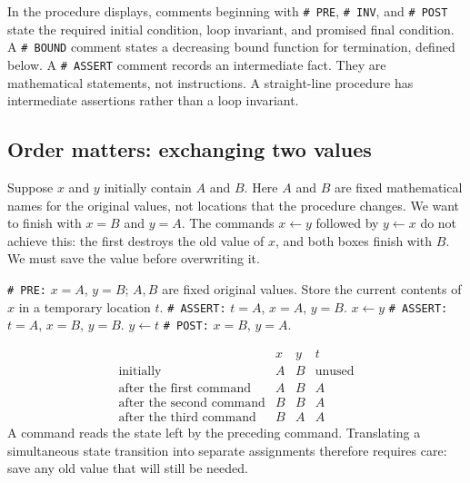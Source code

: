 In the procedure displays, comments beginning with \texttt{\# PRE},
\texttt{\# INV}, and \texttt{\# POST} state the required initial condition,
loop invariant, and promised final condition. A \texttt{\# BOUND} comment
states a decreasing bound function for termination, defined below. A \texttt{\# ASSERT} comment
records an intermediate fact. They are mathematical statements, not
instructions. A straight-line procedure has intermediate assertions rather
than a loop invariant.

\subsection{Order matters: exchanging two values}

Suppose $x$ and $y$ initially contain $A$ and $B$. Here $A$ and $B$ are
fixed mathematical names for the original values, not locations that the
procedure changes. We want to finish with $x=B$ and $y=A$.
The commands $x\leftarrow y$ followed by $y\leftarrow x$ do not achieve
this: the first destroys the old value of $x$, and both boxes finish with
$B$. We must save the value before overwriting it.

\begin{algorithm}[H]
\begin{algorithmic}[1]
\Statex \texttt{\# PRE:} $x=A$, $y=B$; $A,B$ are fixed original values.
\State Store the current contents of $x$ in a temporary location $t$.
\Statex \texttt{\# ASSERT:} $t=A$, $x=A$, $y=B$.
\State $x\leftarrow y$
\Statex \texttt{\# ASSERT:} $t=A$, $x=B$, $y=B$.
\State $y\leftarrow t$
\Statex \texttt{\# POST:} $x=B$, $y=A$.
\EndProcedure
\end{algorithmic}
\caption{Exchange the contents of two specified locations.}
\end{algorithm}

\[
\begin{array}{c|ccc}
 &x&y&t\\\hline
\text{initially}&A&B&\text{unused}\\
\text{after the first command}&A&B&A\\
\text{after the second command}&B&B&A\\
\text{after the third command}&B&A&A
\end{array}
\]
A command reads the state left by the preceding command. Translating a
simultaneous state transition into separate assignments therefore requires
care: save any old value that will still be needed.

